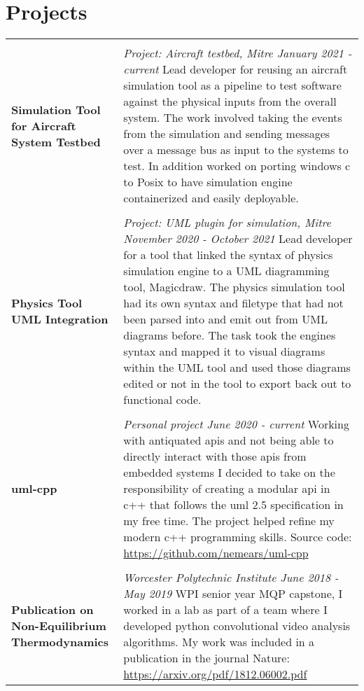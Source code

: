 \documentclass[10pt]{article}
\begin{document}
\section*{Projects}
\begin{tabular}[t]{p{4cm} p{14cm}}
  \hline
  \multicolumn{2}{c}{} \\
  \raggedright
  \large \textbf{Simulation Tool for Aircraft System Testbed} &
  \textit{Project: Aircraft testbed, Mitre \hfill January 2021 - current} \newline
  Lead developer for reusing an aircraft simulation tool as a pipeline to test software against the physical inputs from the overall system. The work involved taking the events from the simulation and sending messages over a message bus as input to the systems to test. In addition worked on porting windows c to Posix to have simulation engine containerized and easily deployable.\\
  \multicolumn{2}{c}{} \\
  \large \textbf{Physics Tool UML Integration} &
  \textit{Project: UML plugin for simulation, Mitre \hfill November 2020 - October 2021} \newline
  Lead developer for a tool that linked the syntax of physics simulation engine to a UML diagramming tool, Magicdraw. The physics simulation tool had its own syntax and filetype that had not been parsed into and emit out from UML diagrams before. The task took the engines syntax and mapped it to visual diagrams within the UML tool and used those diagrams edited or not in the tool to export back out to functional code. \\
  \multicolumn{2}{c}{} \\
  \large \textbf{uml-cpp} &
  \textit{Personal project \hfill June 2020 - current} \newline
  Working with antiquated apis and not being able to directly interact with those apis from embedded systems I decided to take on the responsibility of creating a modular api in c++ that follows the uml 2.5 specification in my free time. The project helped refine my modern c++ programming skills. Source code: \url{https://github.com/nemears/uml-cpp} \\
  \multicolumn{2}{c}{} \\
  \raggedright
  \large \textbf{Publication on Non-Equilibrium Thermodynamics} &
  \textit{Worcester Polytechnic Institute \hfill June 2018 - May 2019} \newline
  WPI senior year MQP capstone, I worked in a lab as part of a team where I developed python convolutional video analysis algorithms. My work was included in a publication in the journal Nature: \url{https://arxiv.org/pdf/1812.06002.pdf} \\
\end{tabular}
\end{document}
